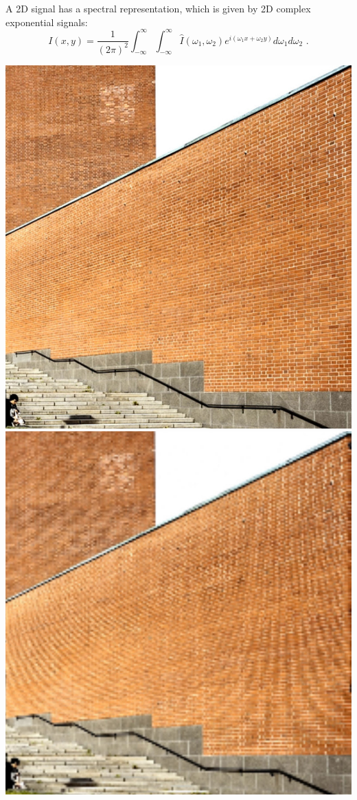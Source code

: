 A 2D signal has a spectral representation, which is given by 2D complex exponential signals:
\begin{equation}
  I(x,y) = \frac{1}{(2\pi)^{2}} \int_{-\infty}^{\infty} \int_{-\infty}^{\infty} \hat{I}(\omega_1,\omega_2) e^{i(\omega_1 x + \omega_2 y)} d\omega_1 d\omega_2\,\,.
\end{equation}
\begin{marginfigure}
  \begin{center}
    \includegraphics[width=\textwidth]{ch09/figures/briko.jpg}
    \includegraphics[width=\textwidth]{ch09/figures/brickd.jpg}

\end{center}
\end{marginfigure}
